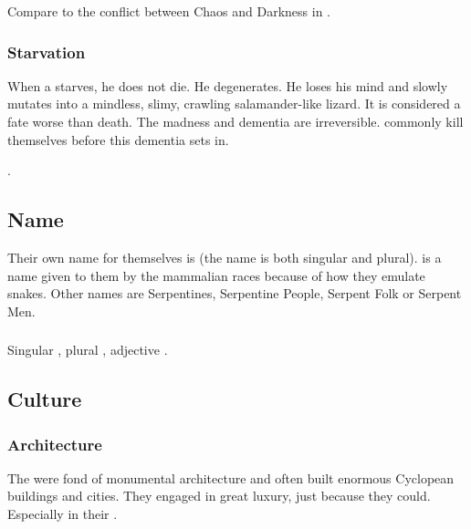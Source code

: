 Compare to the conflict between Chaos and Darkness in \cite{StevenEriksonIanCameronEsslemont:MalazanBookoftheFallen}. 





\subsubsection{Starvation}
When a \caisith starves, he does not die.
He degenerates.
He loses his mind and slowly mutates into a mindless, slimy, crawling salamander-like lizard. 
It is considered a fate worse than death.
The madness and dementia are irreversible. 
\Caisith commonly kill themselves before this dementia sets in. 

\Dragons {}.









\subsection{Name}
Their own name for themselves is \caisith (the name is both singular and plural). 
\quo{\Ophidian} is a name given to them by the mammalian races because of how they emulate snakes. 
Other names are Serpentines, Serpentine People, Serpent Folk or Serpent Men. 





\subsubsection{\QuilJaar}
Singular \emph{\quiljaar{}}, plural \emph{\quiljaaran{}}, adjective \emph{\quiljaaran{}}. 









\subsection{Culture}





\subsubsection{Architecture}
The \ophidians{} were fond of monumental architecture and often built enormous Cyclopean buildings and cities.
They engaged in great luxury, just because they could. 
Especially in their . 


